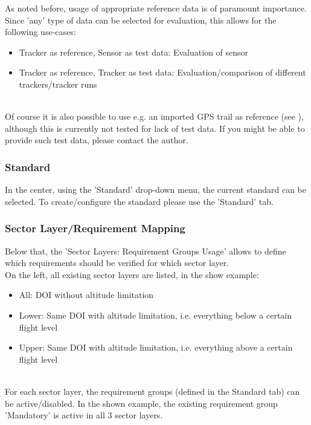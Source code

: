 As noted before, usage of appropriate reference data is of paramount importance. \\

Since 'any' type of data can be selected for evaluation, this allows for the following use-cases:
\begin{itemize}  
\item Tracker as reference, Sensor as test data: Evaluation of sensor
\item Tracker as reference, Tracker as test data: Evaluation/comparison of different trackers/tracker runs
\end{itemize}
\ \\

Of course it is also possible to use e.g. an imported GPS trail as reference (see ), although this is currently not tested for lack of test data. If you might be able to provide such test data, please contact the author. \\

\subsubsection{Standard}
In the center, using the 'Standard' drop-down menu, the current standard can be selected. To create/configure the standard please use the 'Standard' tab.

\subsubsection{Sector Layer/Requirement Mapping}

Below that, the 'Sector Layers: Requirement Groups Usage' allows to define which requirements should be verified for which sector layer. \\

On the left, all existing sector layers are listed, in the show example:
\begin{itemize}  
\item All: DOI without altitude limitation
\item Lower: Same DOI with altitude limitation, i.e. everything below a certain flight level
\item Upper: Same DOI with altitude limitation, i.e. everything above a certain flight level
\end{itemize}
\ \\

For each sector layer, the requirement groups (defined in the Standard tab) can be active/disabled. In the shown example, the existing requirement group 'Mandatory' is active in all 3 sector layers.


